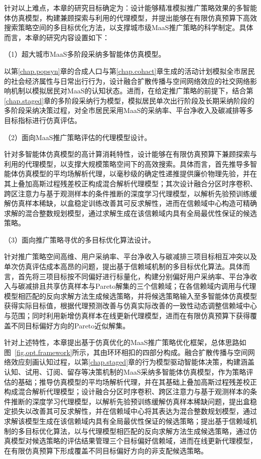 针对以上难点，本章的研究目标确定为：设计能够精准模拟推广策略效果的多智能体仿真模型，构建兼顾探索与利用的代理模型，并提出能够在有限仿真预算下高效搜索策略空间的多目标优化方法，以支撑城市级MaaS推广策略的科学制定。具体而言，本章的研究内容设置如下：

（1）超大城市MaaS多阶段采纳多智能体仿真模型。

以第\ref{chap.popsyn}章的合成人口与第\ref{chap.cohact}章生成的活动计划模拟全市居民的社会经济属性与日常出行行为，设计融合扩散传播与空间网络效应的社交网络影响机制以模拟居民对MaaS的认知状态。进而，在给定推广策略的前提下，结合第\ref{chap.staged}章的多阶段采纳行为模型，模拟居民单次出行阶段及长期采纳阶段的多阶段采纳决策过程，对全市居民采用MaaS的采纳率、平台净收入及碳减排等多目标指标进行仿真评估。

（2）面向MaaS推广策略评估的代理模型设计。

针对多智能体仿真模型的高计算消耗特性，设计能够在有限仿真预算下兼顾探索与利用的代理模型，以支撑大规模策略空间下的高效搜索。具体而言，首先推导多智能体仿真模型的平均场解析代理，以毫秒级的确定性递推提供廉价物理先验，并在其上叠加高斯过程残差校正构成混合解析代理模型；其次设计融合分区时序卷积、跨区注意力与基于观测样本的条件推断的深度学习代理模型，以解析先验预训练缓解仿真样本稀缺，以盒稳定训练改善其可反求解性，进而在信赖域中心构造可精确求解的混合整数规划模型，通过求解生成在该信赖域内具有全局最优性保证的候选策略。

（3）面向推广策略寻优的多目标优化算法设计。

针对推广策略空间高维、用户采纳率、平台净收入与碳减排三项目标相互冲突以及单次仿真评估成本高昂的问题，提出基于信赖域机制的多目标优化算法。具体而言，首先将三项目标按不同偏好进行标量化，构建分别偏好用户采纳率、平台净收入与碳减排且共享仿真样本与Pareto解集的三个信赖域；在各信赖域内调用与代理模型相匹配的反向求解方法生成候选策略，并将候选策略输入至多智能体仿真模型获得实际目标值，根据代理预测改善与仿真实际改善的一致性动态调整信赖域中心与范围；同时利用新增仿真样本在线更新代理模型，进而在有限仿真预算下获得覆盖不同目标偏好方向的Pareto近似解集。

针对上述特性，本章提出基于仿真优化的MaaS推广策略优化框架，总体思路如图~\ref{fig.opt.framework}所示，其由环环相扣的四部分构成。融合扩散传播与空间网络效应刻画认知过程，以第\ref{chap.staged}章的行为模型驱动智能体决策，构建涵盖认知、试用、订阅、留存等决策机制的MaaS采纳多智能体仿真模型，作为策略评估的基础；推导仿真模型的平均场解析代理，并在其基础上叠加高斯过程残差校正构成混合解析代理模型；设计融合分区时序卷积、跨区注意力与基于观测样本的条件推断的深度学习代理模型，以解析先验预训练缓解仿真样本稀缺问题，提出盒稳定损失以改善其可反求解性，并在信赖域中心将其表达为混合整数规划模型，通过求解该模型生成在该信赖域内具有全局最优性保证的候选策略；提出基于信赖域机制的多目标优化算法，以与代理模型相匹配的反向求解方法生成候选策略，通过仿真模型对候选策略的评估结果管理三个目标偏好信赖域，进而在线更新代理模型，在有限仿真预算下形成覆盖不同目标偏好方向的非支配候选策略。

